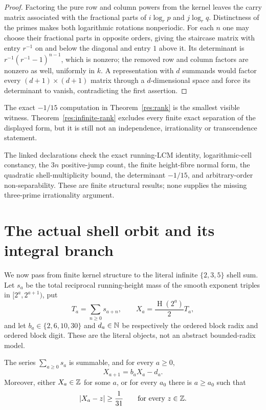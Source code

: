 \documentclass[11pt]{article}
\newcommand{\hgt}{\operatorname{H}}
\begin{document}
\begin{proof}
Factoring the pure row and column powers from the kernel leaves the carry
matrix associated with the fractional parts of $i\log_r p$ and
$j\log_r q$.  Distinctness of the primes makes both logarithmic rotations
nonperiodic.  For each $n$ one may choose their fractional parts in opposite
orders, giving the staircase matrix with entry $r^{-1}$ on and below the
diagonal and entry $1$ above it.  Its determinant is
$r^{-1}(r^{-1}-1)^{n-1}$, which is nonzero; the removed row and column factors
are nonzero as well, uniformly in $k$.  A representation with $d$ summands
would factor every $(d+1)\times(d+1)$ matrix through a $d$-dimensional space
and force its determinant to vanish, contradicting the first assertion.
\end{proof}

The exact $-1/15$ computation in Theorem~\ref{res:rank} is the smallest
visible witness.  Theorem~\ref{res:infinite-rank} excludes every finite exact
separation of the displayed form, but it is still not an independence,
irrationality or transcendence statement.

The linked declarations check the exact running-LCM identity,
logarithmic-cell constancy, the $3n$ positive-jump count, the finite
height-fibre normal form, the quadratic shell-multiplicity bound, the
determinant $-1/15$, and arbitrary-order non-separability.  These are finite
structural results; none supplies the missing three-prime irrationality
argument.

\section{The actual shell orbit and its integral branch}\label{sec:actual-orbit}

We now pass from finite kernel structure to the literal infinite
$\{2,3,5\}$ shell sum.  Let $s_a$ be the total reciprocal running-height mass
of the smooth exponent triples in $[2^a,2^{a+1})$, put
\[
 T_a=\sum_{n\ge0}s_{a+n},\qquad
 X_a=\frac{\hgt(2^a)}2T_a,
\]
and let $b_a\in\{2,6,10,30\}$ and $d_a\in\mathbb{N}$ be respectively the ordered
block radix and ordered block digit.  These are the literal objects, not an
abstract bounded-radix model.

\begin{theorem}\label{res:actual-orbit}
The series $\sum_{a\ge0}s_a$ is summable, and for every $a\ge0$,
\[
 X_{a+1}=b_aX_a-d_a.
\]
Moreover, either $X_a\in\mathbb{Z}$ for some $a$, or for every $a_0$ there is
$a\ge a_0$ such that
\[
 |X_a-z|\ge\frac1{31}\qquad\hbox{for every }z\in\mathbb{Z}.
\]
\end{theorem}
\end{document}
